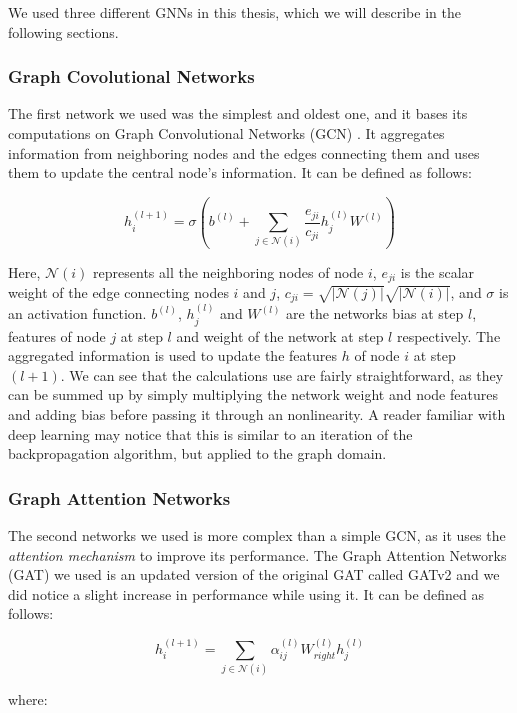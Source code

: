 \documentclass[times, utf8, diplomski, english]{fer_eng}
\begin{document}
We used three different GNNs in this thesis, which we will describe in the following sections.

\subsubsection{Graph Covolutional Networks}

The first network we used was the simplest and oldest one, and it bases its computations on Graph Convolutional Networks (GCN) \cite{GCN}. It aggregates information from neighboring nodes and the edges connecting them and uses them to update the central node's information. It can be defined as follows:

\[ h_i^{(l+1)} = \sigma (b^{(l)} + \sum_{j \in \mathcal{N}(i)} \frac{e_{ji}}{c_{ji}} h_j^{(l)} W^{(l)} ) \]

Here, $\mathcal{N}(i)$ represents all the neighboring nodes of node $i$, $e_{ji}$ is the scalar weight of the edge connecting nodes $i$ and $j$, $c_{ji} = \sqrt{|\mathcal{N}(j)|} \sqrt{|\mathcal{N}(i)|}$, and $\sigma$ is an activation function. $b^{(l)}$, $h_j^{(l)}$ and $W^{(l)}$ are the networks bias at step $l$, features of node $j$ at step $l$ and weight of the network at step $l$ respectively. The aggregated information is used to update the features $h$ of node $i$ at step $(l+1)$. We can see that the calculations use are fairly straightforward, as they can be summed up by simply multiplying the network weight and node features and adding bias before passing it through an nonlinearity. A reader familiar with deep learning may notice that this is similar to an iteration of the backpropagation algorithm, but applied to the graph domain.

\subsubsection{Graph Attention Networks}
\label{Graph Attention Networks}

The second networks we used is more complex than a simple GCN, as it uses the \textit{attention mechanism} \cite{attention} to improve its performance. The Graph Attention Networks (GAT) \cite{GATv2} we used is an updated version of the original GAT \cite{GAT} called GATv2 and we did notice a slight increase in performance while using it. It can be defined as follows:

\[ h_i^{(l+1)} = \sum_{j \in \mathcal{N}(i)} \alpha_{ij}^{(l)} W_{right}^{(l)} h_j^{(l)} \]

where:
\end{document}
